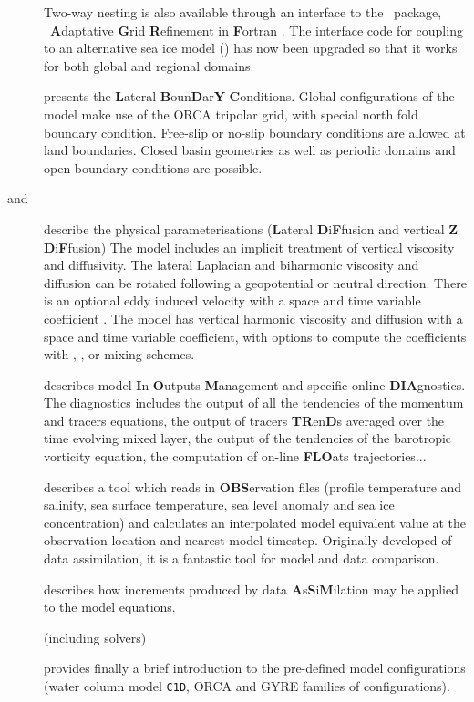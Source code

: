 \begin{description}
Two-way nesting is also available through an interface to the \AGRIF\ package,
\ie\ \textbf{A}daptative \textbf{G}rid \textbf{R}efinement in \textbf{F}ortran
\citep{debreu.vouland.ea_CG08}.
The interface code for coupling to an alternative sea ice model (\CICE) has now been upgraded so that
it works for both global and regional domains.
\item [\nameref{chap:LBC}] presents the \textbf{L}ateral
\textbf{B}oun\textbf{D}ar\textbf{Y} \textbf{C}onditions.
Global configurations of the model make use of the ORCA tripolar grid,
with special north fold boundary condition.
Free-slip or no-slip boundary conditions are allowed at land boundaries.
Closed basin geometries as well as periodic domains and open boundary conditions are possible.
\item [\nameref{chap:LDF} and \nameref{chap:ZDF}] describe the physical parameterisations
(\textbf{L}ateral \textbf{D}i\textbf{F}fusion and vertical \textbf{Z} \textbf{D}i\textbf{F}fusion)
The model includes an implicit treatment of vertical viscosity and diffusivity.
The lateral Laplacian and biharmonic viscosity and diffusion can be rotated following
a geopotential or neutral direction.
There is an optional eddy induced velocity \citep{gent.mcwilliams_JPO90} with
a space and time variable coefficient \citet{treguier.held.ea_JPO97}.
The model has vertical harmonic viscosity and diffusion with a space and time variable coefficient,
with options to compute the coefficients with \citet{blanke.delecluse_JPO93},
\citet{pacanowski.philander_JPO81}, or \citet{umlauf.burchard_JMR03} mixing schemes.
\item [\nameref{chap:DIA}] describes model \textbf{I}n-\textbf{O}utputs \textbf{M}anagement and
specific online \textbf{DIA}gnostics.
The diagnostics includes the output of all the tendencies of the momentum and tracers equations,
the output of tracers \textbf{TR}en\textbf{D}s averaged over the time evolving mixed layer,
the output of the tendencies of the barotropic vorticity equation,
the computation of on-line \textbf{FLO}ats trajectories...
\item [\nameref{chap:OBS}] describes a tool which reads in \textbf{OBS}ervation files
(profile temperature and salinity, sea surface temperature, sea level anomaly and
sea ice concentration) and calculates an interpolated model equivalent value at
the observation location and nearest model timestep.
Originally developed of data assimilation, it is a fantastic tool for model and data comparison.
\item [\nameref{chap:ASM}] describes how increments produced by
data \textbf{A}s\textbf{S}i\textbf{M}ilation may be applied to the model equations.
\item [\nameref{chap:STO}]
\item [\nameref{chap:MISC}] (including solvers)
\item [\nameref{chap:CFGS}] provides finally a brief introduction to
the pre-defined model configurations
(water column model \texttt{C1D}, ORCA and GYRE families of configurations).
\end{description}

